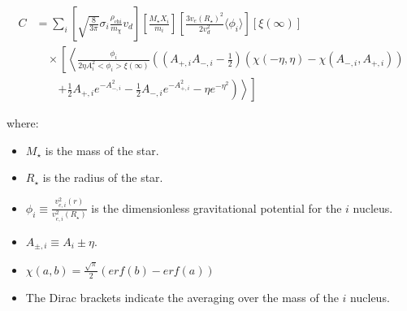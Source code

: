 \begin{equation}
\begin{split}
    C &= \sum_i \left[\sqrt{\frac{8}{3\pi}}\sigma_i\frac{\rho_{\text{chi}}}{m_{\chi}}v_d\right] \left[\frac{M_{\star}X_i}{m_i}\right] \left[\frac{3v_e(R_{\star})^2}{2v_d^2}\langle\phi_i\rangle\right] \left[\xi(\infty)\right] \\ 
    &\quad\times \left[\left<\frac{\phi_i}{{2 \eta A_i^2<\phi_i> \xi(\infty)}} \left( (A_{+,i}  A_{-,i} - \frac{1}{2}) (\chi(-\eta,\eta) - \chi(A_{-,i},A_{+,i})) \right.\right.\right. \\
    &\quad\quad\left.\left.\left. + \frac{1}{2} A_{+,i} e^{-A_{-,i}^2} - \frac{1}{2} A_{-,i} e^{-A_{+,i}^2} - \eta  e^{-\eta^2} \right)\right>\right]
\end{split}
\end{equation}

where:
\begin{itemize}
    \item $M_{\star}$ is the mass of the star.
    \item $R_{\star}$ is the radius of the star.
    \item $\phi_i\equiv\frac{v_{e,i}^2(r)}{v_{e,i}^2(R_{\star})}$ is the dimensionless gravitational potential for the $i$ nucleus.
    \item $A_{\pm,i}\equiv A_i\pm \eta$.
    \item $\chi(a,b)=\frac{\sqrt{\pi}}{2}(erf(b)-erf(a))$
    \item The Dirac brackets indicate the averaging over the mass of the $i$ nucleus.
\end{itemize} 


 
